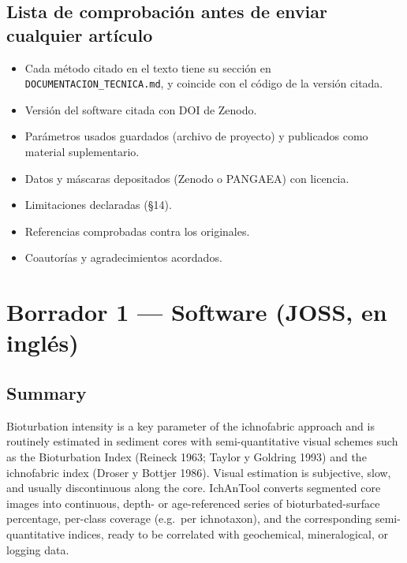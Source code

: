 \documentclass[
  10pt,
]{article}
\providecommand{\tightlist}{%
  \setlength{\itemsep}{0pt}\setlength{\parskip}{0pt}}
\begin{document}
\hypertarget{lista-de-comprobaciuxf3n-antes-de-enviar-cualquier-artuxedculo}{%
\subsection{Lista de comprobación antes de enviar cualquier
artículo}\label{lista-de-comprobaciuxf3n-antes-de-enviar-cualquier-artuxedculo}}

\begin{itemize}
\tightlist
\item[$\square$]
  Cada método citado en el texto tiene su sección en
  \texttt{DOCUMENTACION\_TECNICA.md}, y coincide con el código de la
  versión citada.
\item[$\square$]
  Versión del software citada con DOI de Zenodo.
\item[$\square$]
  Parámetros usados guardados (archivo de proyecto) y publicados como
  material suplementario.
\item[$\square$]
  Datos y máscaras depositados (Zenodo o PANGAEA) con licencia.
\item[$\square$]
  Limitaciones declaradas (§14).
\item[$\square$]
  Referencias comprobadas contra los originales.
\item[$\square$]
  Coautorías y agradecimientos acordados.
\end{itemize}

\newpage

\hypertarget{borrador-1-software-joss-en-ingluxe9s}{%
\section{Borrador 1 --- Software (JOSS, en
inglés)}\label{borrador-1-software-joss-en-ingluxe9s}}

\hypertarget{summary}{%
\subsection{Summary}\label{summary}}

Bioturbation intensity is a key parameter of the ichnofabric approach
and is routinely estimated in sediment cores with semi-quantitative
visual schemes such as the Bioturbation Index (Reineck 1963; Taylor y
Goldring 1993) and the ichnofabric index (Droser y Bottjer 1986). Visual
estimation is subjective, slow, and usually discontinuous along the
core. IchAnTool converts segmented core images into continuous, depth-
or age-referenced series of bioturbated-surface percentage, per-class
coverage (e.g.~per ichnotaxon), and the corresponding semi-quantitative
indices, ready to be correlated with geochemical, mineralogical, or
logging data.
\end{document}
